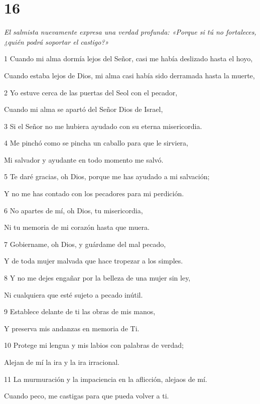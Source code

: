 \chapter{16}

\par \textit{El salmista nuevamente expresa una verdad profunda: «Porque si tú no fortaleces, ¿quién podrá soportar el castigo?»}

\par 1 Cuando mi alma dormía lejos del Señor, casi me había deslizado hasta el hoyo,
\par     Cuando estaba lejos de Dios, mi alma casi había sido derramada hasta la muerte,
\par 2 Yo estuve cerca de las puertas del Seol con el pecador,
\par     Cuando mi alma se apartó del Señor Dios de Israel,
\par 3 Si el Señor no me hubiera ayudado con su eterna misericordia.
\par   
\par 4 Me pinchó como se pincha un caballo para que le sirviera,
\par     Mi salvador y ayudante en todo momento me salvó.
\par 5 Te daré gracias, oh Dios, porque me has ayudado a mi salvación;
\par     Y no me has contado con los pecadores para mi perdición.
\par 6 No apartes de mí, oh Dios, tu misericordia,
\par     Ni tu memoria de mi corazón hasta que muera.
\par 7 Gobiername, oh Dios, y guárdame del mal pecado,
\par     Y de toda mujer malvada que hace tropezar a los simples.
\par 8 Y no me dejes engañar por la belleza de una mujer sin ley,
\par     Ni cualquiera que esté sujeto a pecado inútil.
\par   
\par 9 Establece delante de ti las obras de mis manos,
\par     Y preserva mis andanzas en memoria de Ti.
\par 10 Protege mi lengua y mis labios con palabras de verdad;
\par     Alejan de mí la ira y la ira irracional.
\par 11 La murmuración y la impaciencia en la aflicción, alejaos de mí.
\par     Cuando peco, me castigas para que pueda volver a ti.
